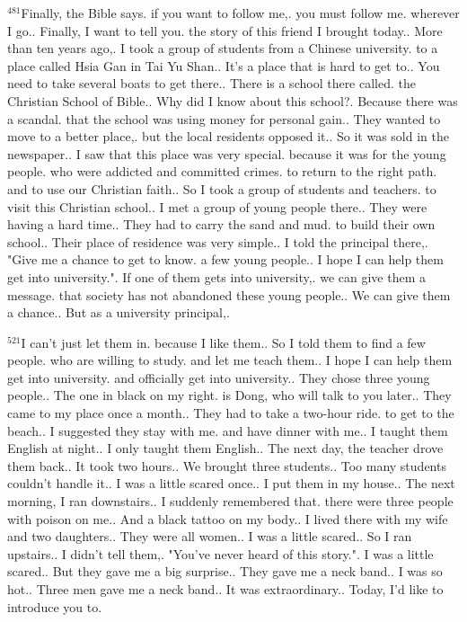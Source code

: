 \documentclass{book}
\begin{document}
$^{481}$Finally, the Bible says.
if you want to follow me,.
you must follow me.
wherever I go..
Finally, I want to tell you.
the story of this friend I brought today..
More than ten years ago,.
I took a group of students from a Chinese university.
to a place called Hsia Gan in Tai Yu Shan..
It's a place that is hard to get to..
You need to take several boats to get there..
There is a school there called.
the Christian School of Bible..
Why did I know about this school?.
Because there was a scandal.
that the school was using money for personal gain..
They wanted to move to a better place,.
but the local residents opposed it..
So it was sold in the newspaper..
I saw that this place was very special.
because it was for the young people.
who were addicted and committed crimes.
to return to the right path.
and to use our Christian faith..
So I took a group of students and teachers.
to visit this Christian school..
I met a group of young people there..
They were having a hard time..
They had to carry the sand and mud.
to build their own school..
Their place of residence was very simple..
I told the principal there,.
"Give me a chance to get to know.
a few young people..
I hope I can help them get into university.".
If one of them gets into university,.
we can give them a message.
that society has not abandoned these young people..
We can give them a chance..
But as a university principal,.

$^{521}$I can't just let them in.
because I like them..
So I told them to find a few people.
who are willing to study.
and let me teach them..
I hope I can help them get into university.
and officially get into university..
They chose three young people..
The one in black on my right.
is Dong, who will talk to you later..
They came to my place once a month..
They had to take a two-hour ride.
to get to the beach..
I suggested they stay with me.
and have dinner with me..
I taught them English at night..
I only taught them English..
The next day, the teacher drove them back..
It took two hours..
We brought three students..
Too many students couldn't handle it..
I was a little scared once..
I put them in my house..
The next morning, I ran downstairs..
I suddenly remembered that.
there were three people with poison on me..
And a black tattoo on my body..
I lived there with my wife and two daughters..
They were all women..
I was a little scared..
So I ran upstairs..
I didn't tell them,.
"You've never heard of this story.".
I was a little scared..
But they gave me a big surprise..
They gave me a neck band..
I was so hot..
Three men gave me a neck band..
It was extraordinary..
Today, I'd like to introduce you to.
\end{document}
